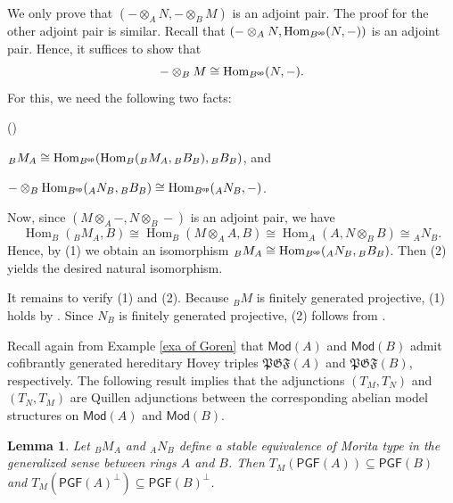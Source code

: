 \documentclass[12pt,twoside]{amsart}
\theoremstyle{bfupright head,slanted body}
\theoremstyle{bfupright head,upright body}
\theoremstyle{fixed bf head,slanted body}
\newtheorem{lem}[res]{Lemma}            \newtheorem*{lem*}{Lemma}
\theoremstyle{fixed bf head,upright body}
\theoremstyle{numbered paragraph}
\newlength{\thmlistleft}        %
\newlength{\thmlistright}       %
\newlength{\thmlistpartopsep}   %
\newlength{\thmlisttopsep}      %
\newlength{\thmlistparsep}      %
\newlength{\thmlistitemsep}     %
\newcounter{rqm}
\newenvironment{rqm}{\begin{list}{\upshape (\arabic{rqm})}%
    {\usecounter{rqm}%
      \setlength{\leftmargin}{\thmlistleft}%
      \setlength{\labelwidth}{\thmlistleft}%
      \setlength{\rightmargin}{\thmlistright}%
      \setlength{\partopsep}{\thmlistpartopsep}%
      \setlength{\topsep}{\thmlisttopsep}%
      \setlength{\parsep}{\thmlistparsep}%
      \setlength{\itemsep}{\thmlistitemsep}}}%
  {\end{list}}%
\newenvironment{prf*}[1][Proof]{%
  \begin{proof}[\bf #1]
    \setcounter{equation}{0}
    \renewcommand{\theequation}{\arabic{equation}}}
  {\end{proof}
}
\newcommand{\prpcite}[2][?]{\cite[Proposition~#1]{#2}}
\newcommand{\exercite}[2][?]{\cite[Exercise~#1]{#2}}
\numberwithin{equation}{res}
\newcommand{\PGF}{\mathsf{PGF}}
\newcommand{\Mod}{\mathsf{Mod}}
\newcommand{\Bop}{B^{\sf op}}
\newcommand{\Hom}{\operatorname{Hom}}
\begin{document}
\begin{prf*}
We only prove that $(- \otimes_A N, - \otimes_B M)$ is an adjoint pair.
The proof for the other adjoint pair is similar.
Recall that $(-\otimes_A N, \Hom_{\Bop}(N, -))$ is an adjoint pair.
Hence, it suffices to show that
\[
-\otimes_B M \cong \Hom_{\Bop}(N, -).
\]
For this, we need the following two facts:
\begin{rqm}
\item
$_BM_A \cong \Hom_{\Bop}(\Hom_B({_BM_A} , {_BB_B}), {_BB_B})$, and
\item
$- \otimes_B \Hom_{\Bop}({_AN_B} , {_BB_B}) \cong \Hom_{\Bop}({_AN_B} , -)$.
\end{rqm}
Now, since $(M \otimes_A -, N \otimes_B -)$ is an adjoint pair, we have
\[
\Hom_B({_BM_A}, B) \cong \Hom_B(M \otimes_A A, B) \cong \Hom_A(A, N \otimes_B B) \cong {_AN_B}.
\]
Hence, by (1) we obtain an isomorphism $_BM_A \cong \Hom_{\Bop}({_AN_B}, {_BB_B})$.
Then (2) yields the desired natural isomorphism.

It remains to verify (1) and (2).
Because $_BM$ is finitely generated projective, (1) holds by \prpcite[20.17]{1992AF}.
Since $N_B$ is finitely generated projective, (2) follows from \exercite[20.12]{1992AF}.
\end{prf*}

Recall again from Example \ref{exa of Goren} that \(\Mod(A)\) and \(\Mod(B)\) admit cofibrantly generated hereditary Hovey triples \(\mathfrak{PGF}(A)\) and \(\mathfrak{PGF}(B)\), respectively.
The following result implies that the adjunctions $(T_M, T_N)$ and $(T_N, T_M)$ are Quillen adjunctions between the corresponding abelian model structures on $\Mod(A)$ and $\Mod(B)$.

\begin{lem} \label{T_M preserve adjoint type}
Let $_BM_A$ and $_AN_B$ define a stable equivalence of Morita type in the generalized sense between rings $A$ and $B$.
Then $T_M(\PGF(A)) \subseteq \PGF(B)$ and $T_M(\PGF(A)^\bot) \subseteq \PGF(B)^\bot$.
\end{lem}
\end{document}

